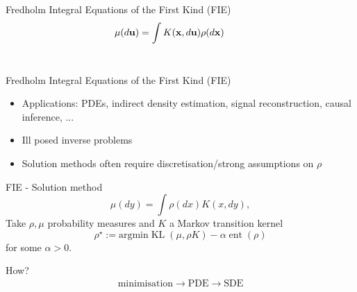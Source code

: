 \documentclass[aspectratio=149]{beamer}
\DeclareMathOperator{\KL}{KL}
\DeclareMathOperator{\ent}{ent}
\newcommand{\tikzmark}[1]{\tikz[overlay,remember picture] \node (#1) {};}
\begin{document}
\begin{frame}{Fredholm Integral Equations of the First Kind (FIE)}
\begin{equation*}
      \mu\tikzmark{a}(d\mathbf{u}) = \int K(\mathbf{x} \tikzmark{b},d\mathbf{u})\rho\tikzmark{c}(d\mathbf{x})\ \qquad
\end{equation*}\\[2ex]
\centering

\qquad 
{}
\qquad
\vskip 10pt
  
\end{frame}

\begin{frame}{Fredholm Integral Equations of the First Kind (FIE)}

\begin{itemize}
\item Applications: PDEs, indirect density estimation, signal reconstruction, causal inference, ...
\item Ill posed inverse problems
\item Solution methods often require discretisation/strong assumptions on $\rho$
\end{itemize}
\end{frame}

\begin{frame}{FIE - Solution method}
\begin{equation*}
\mu(dy) = \int \rho(dx) K(x,dy),
\end{equation*}
Take $\rho,\mu$ probability measures and $K$ a Markov transition kernel
\begin{equation*}
\rho^\star:= \text{argmin}\KL(\mu,\rho K)-\alpha\ent(\rho)
\end{equation*}
for some $\alpha>0$.
\pause

How?
\begin{align*}
\text{minimisation}\longrightarrow \text{PDE}\longrightarrow \text{SDE}
\end{align*}
\end{frame}
\end{document}
